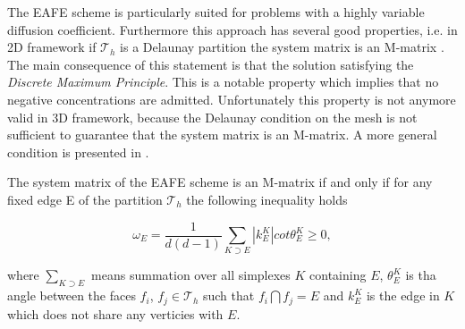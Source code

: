 %
%
%
%
%
%


The EAFE scheme is particularly suited for problems with a highly variable diffusion coefficient. Furthermore this approach has several good properties, i.e. in 2D framework if $\mathcal{T}_h$ is a Delaunay partition the system matrix is an M-matrix \cite{BankMmatrixEAFE}. The main consequence of this statement is that the solution satisfying the \textit{Discrete Maximum Principle}. This is a notable property which implies that no negative concentrations are admitted. Unfortunately this property is not anymore valid in 3D framework, because the Delaunay condition on the mesh is not sufficient to guarantee that the system matrix is an M-matrix. A more general condition is presented in \cite{Zikatanov:EAFE1}.

\begin{Teorema}
The system matrix of the EAFE scheme is an M-matrix if and only if for any fixed edge E of the partition $\mathcal{T}_h$ the following inequality holds

\begin{equation}
\label{eq: mesh delaunay condition}
\omega_E = \dfrac{1}{d(d-1)} \sum_{K\supset E} |k_E^K|cot\theta_E^K \geq 0,
\end{equation}

where $\sum_{K \supset E}$ means summation over all simplexes $K$ containing $E$, $\theta_E^K$ is tha angle between the faces $f_i$, $f_j \in \mathcal{T}_h$ such that $f_i \bigcap f_j = E$  and $k_E^K$ is the edge in $K$ which does not share any verticies with $E$.
\end{Teorema}

